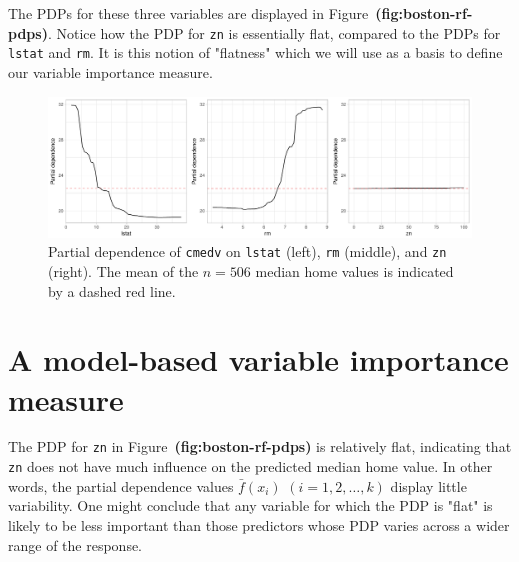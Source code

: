 \documentclass[12pt]{article}
\def\code#1{\texttt{#1}}
\def\ref#1{\textbf{(#1)}}
\begin{document}
The PDPs for these three variables are displayed in Figure~\ref{fig:boston-rf-pdps}. Notice how the PDP for \code{zn} is essentially flat, compared to the PDPs for \code{lstat} and \code{rm}. It is this notion of "flatness" which we will use as a basis to define our variable importance measure.
\begin{figure}[!htb]
  \centering
  \includegraphics[width=1.0\textwidth]{boston-rf-pdps}
  \caption{Partial dependence of \code{cmedv} on \code{lstat} (left), \code{rm} (middle), and \code{zn} (right). The mean of the $n = 506$ median home values is indicated by a dashed red line. \label{fig:boston-rf-pdps}}
\end{figure}


\section{A model-based variable importance measure}
\label{sec:new}

The PDP for \code{zn} in Figure~\ref{fig:boston-rf-pdps} is relatively flat, indicating that \code{zn} does not have much influence on the predicted median home value. In other words, the partial dependence values $\bar{f}\left(x_{i}\right)$ $\left(i = 1, 2, \dots, k\right)$ display little variability. One might conclude that any variable for which the PDP is "flat" is likely to be less important than those predictors whose PDP varies across a wider range of the response.
\end{document}
